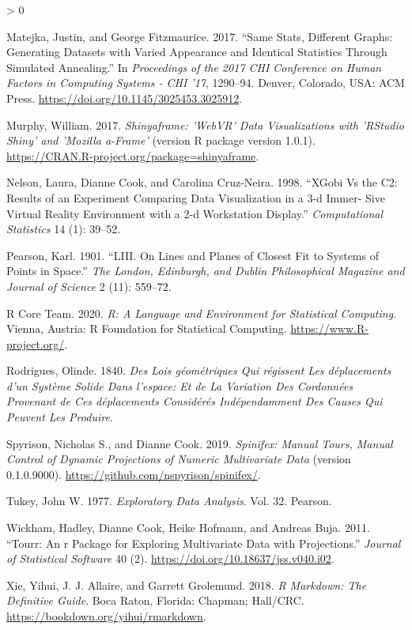 \documentclass[
  11,
]{article}
\newlength{\cslhangindent}
\newenvironment{CSLReferences}[2] %
 {%
  \setlength{\parindent}{0pt}
  \ifodd #1 \everypar{\setlength{\hangindent}{\cslhangindent}}\ignorespaces\fi
  \ifnum #2 > 0
  \setlength{\parskip}{#2\baselineskip}
  \fi
 }%
 {}
\begin{document}
\begin{CSLReferences}{1}{0}
\leavevmode\hypertarget{ref-matejka_same_2017}{}%
Matejka, Justin, and George Fitzmaurice. 2017. {``Same Stats, Different Graphs: Generating Datasets with Varied Appearance and Identical Statistics Through Simulated Annealing.''} In \emph{Proceedings of the 2017 {CHI} Conference on Human Factors in Computing Systems - {CHI} '17}, 1290--94. Denver, Colorado, {USA}: {ACM} Press. \url{https://doi.org/10.1145/3025453.3025912}.

\leavevmode\hypertarget{ref-murphy_shinyaframe_2017}{}%
Murphy, William. 2017. \emph{Shinyaframe: '{WebVR}' Data Visualizations with '{RStudio} Shiny' and 'Mozilla a-Frame'} (version R package version 1.0.1). \url{https://CRAN.R-project.org/package=shinyaframe}.

\leavevmode\hypertarget{ref-nelson_xgobi_1998}{}%
Nelson, Laura, Dianne Cook, and Carolina Cruz-Neira. 1998. {``{XGobi} Vs the C2: Results of an Experiment Comparing Data Visualization in a 3-d Immer- Sive Virtual Reality Environment with a 2-d Workstation Display.''} \emph{Computational Statistics} 14 (1): 39--52.

\leavevmode\hypertarget{ref-pearson_liii._1901}{}%
Pearson, Karl. 1901. {``{LIII}. On Lines and Planes of Closest Fit to Systems of Points in Space.''} \emph{The London, Edinburgh, and Dublin Philosophical Magazine and Journal of Science} 2 (11): 559--72.

\leavevmode\hypertarget{ref-r_core_team_r:_2020}{}%
R Core Team. 2020. \emph{R: {A} {Language} and {Environment} for {Statistical} {Computing}}. Vienna, Austria: R Foundation for Statistical Computing. \url{https://www.R-project.org/}.

\leavevmode\hypertarget{ref-rodrigues_lois_1840}{}%
Rodrigues, Olinde. 1840. \emph{Des Lois géométriques Qui régissent Les déplacements d'un Système Solide Dans l'espace: Et de La Variation Des Cordonnées Provenant de Ces déplacements Considérés Indépendamment Des Causes Qui Peuvent Les Produire}.

\leavevmode\hypertarget{ref-spyrison_spinifex_2019}{}%
Spyrison, Nicholas S., and Dianne Cook. 2019. \emph{Spinifex: Manual Tours, Manual Control of Dynamic Projections of Numeric Multivariate Data} (version 0.1.0.9000). \url{https://github.com/nspyrison/spinifex/}.

\leavevmode\hypertarget{ref-tukey_exploratory_1977}{}%
Tukey, John W. 1977. \emph{Exploratory Data Analysis}. Vol. 32. Pearson.

\leavevmode\hypertarget{ref-wickham_tourr:_2011}{}%
Wickham, Hadley, Dianne Cook, Heike Hofmann, and Andreas Buja. 2011. {``Tourr: An r Package for Exploring Multivariate Data with Projections.''} \emph{Journal of Statistical Software} 40 (2). \url{https://doi.org/10.18637/jss.v040.i02}.

\leavevmode\hypertarget{ref-xie_r_2018}{}%
Xie, Yihui, J. J. Allaire, and Garrett Grolemund. 2018. \emph{R Markdown: The Definitive Guide}. Boca Raton, Florida: Chapman; Hall/{CRC}. \url{https://bookdown.org/yihui/rmarkdown}.

\end{CSLReferences}
\end{document}
